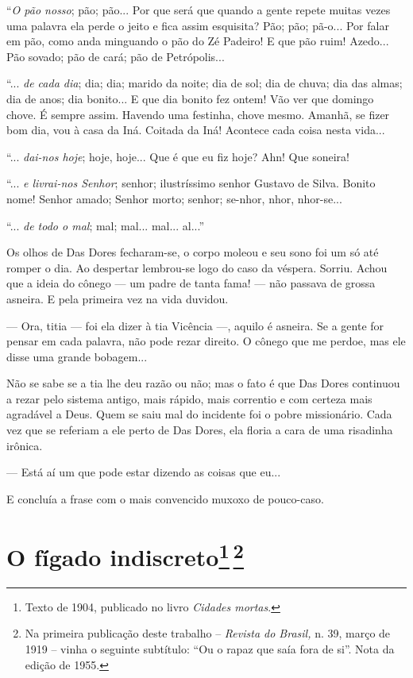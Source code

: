 ``\emph{O pão nosso}; pão; pão... Por que será que quando a gente repete
muitas vezes uma palavra ela perde o jeito e fica assim esquisita? Pão;
pão; pã-o... Por falar em pão, como anda minguando o pão do Zé Padeiro!
E que pão ruim! Azedo... Pão sovado; pão de cará; pão de Petrópolis...

``... \emph{de cada dia}; dia; dia; marido da noite; dia de sol; dia de
chuva; dia das almas; dia de anos; dia bonito... E que dia bonito fez
ontem! Vão ver que domingo chove. É sempre assim. Havendo uma festinha,
chove mesmo. Amanhã, se fizer bom dia, vou à casa da Iná. Coitada da
Iná! Acontece cada coisa nesta vida...

``... \emph{dai-nos hoje}; hoje, hoje... Que é que eu fiz hoje? Ahn! Que
soneira!

``... \emph{e livrai-nos Senhor}; senhor; ilustríssimo senhor Gustavo de
Silva. Bonito nome! Senhor amado; Senhor morto; senhor; se-nhor, nhor,
nhor-se...

``... \emph{de todo o mal}; mal; mal... mal... al...''

Os olhos de Das Dores fecharam-se, o corpo moleou e seu sono foi um só
até romper o dia. Ao despertar lembrou-se logo do caso da véspera.
Sorriu. Achou que a ideia do cônego --- um padre de tanta fama! --- não
passava de grossa asneira. E pela primeira vez na vida duvidou.

--- Ora, titia --- foi ela dizer à tia Vicência ---, aquilo é asneira.
Se a gente for pensar em cada palavra, não pode rezar direito. O cônego
que me perdoe, mas ele disse uma grande bobagem...

Não se sabe se a tia lhe deu razão ou não; mas o fato é que Das Dores
continuou a rezar pelo sistema antigo, mais rápido, mais correntio e com
certeza mais agradável a Deus. Quem se saiu mal do incidente foi o pobre
missionário. Cada vez que se referiam a ele perto de Das Dores, ela
floria a cara de uma risadinha irônica.

--- Está aí um que pode estar dizendo as coisas que eu...

E concluía a frase com o mais convencido muxoxo de pouco-caso.

\chapter{O fígado indiscreto\footnote[*]{Texto de 1904, publicado no livro \emph{Cidades mortas}.}\,\footnote[**]{Na primeira publicação
  deste trabalho -- \emph{Revista do Brasil,} n. 39, março de 1919 --
  vinha o seguinte subtítulo: ``Ou o rapaz que saía fora de si''. Nota
  da edição de 1955.}}

